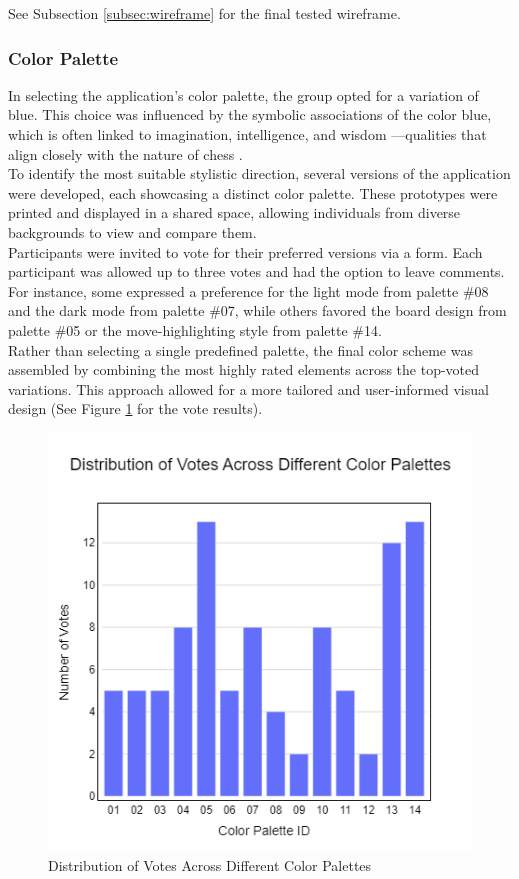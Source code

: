 See Subsection \ref{subsec:wireframe} for the final tested wireframe.

\newpage

\subsubsection*{Color Palette}
\label{subsubsec:color-palette}

In selecting the application's color palette, the group opted for a variation of blue. This choice was influenced by the symbolic associations of the color blue, which is often linked to imagination, intelligence, and wisdom \cite{blue}—qualities that align closely with the nature of chess \cite{chess:ppqty, chess:chess-and-creativity}. \\

To identify the most suitable stylistic direction, several versions of the application were developed, each showcasing a distinct color palette. These prototypes were printed and displayed in a shared space, allowing individuals from diverse backgrounds to view and compare them. \\

Participants were invited to vote for their preferred versions via a form. Each participant was allowed up to three votes and had the option to leave comments. For instance, some expressed a preference for the light mode from palette \#08 and the dark mode from palette \#07, while others favored the board design from palette \#05 or the move-highlighting style from palette \#14. \\

Rather than selecting a single predefined palette, the final color scheme was assembled by combining the most highly rated elements across the top-voted variations. This approach allowed for a more tailored and user-informed visual design (See Figure \ref{fig:color-palette-results} for the vote results). \\

\begin{figure}[h!]
    \centering
    \includegraphics[width=0.75\linewidth]{figures/methods/color-palette-results.png}
    \caption{Distribution of Votes Across Different Color Palettes}
    \label{fig:color-palette-results}
\end{figure}

